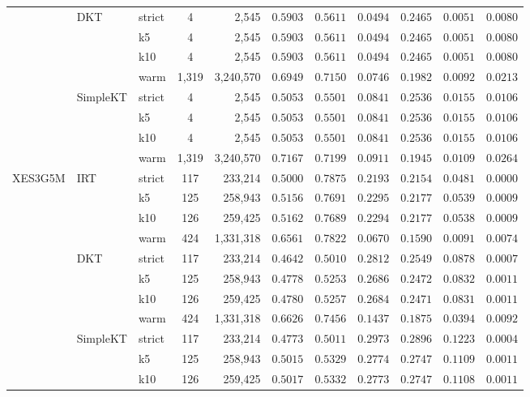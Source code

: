 \begin{table}[tbp]
{\begin{tabular}{lllcrcccccc}
 & DKT & strict & 4 & 2,545 & $0.5903$ & $0.5611$ & $0.0494$ & $0.2465$ & $0.0051$ & $0.0080$ \\
 &  & k5 & 4 & 2,545 & $0.5903$ & $0.5611$ & $0.0494$ & $0.2465$ & $0.0051$ & $0.0080$ \\
 &  & k10 & 4 & 2,545 & $0.5903$ & $0.5611$ & $0.0494$ & $0.2465$ & $0.0051$ & $0.0080$ \\
 &  & warm & 1,319 & 3,240,570 & $0.6949$ & $0.7150$ & $0.0746$ & $0.1982$ & $0.0092$ & $0.0213$ \\
 & SimpleKT & strict & 4 & 2,545 & $0.5053$ & $0.5501$ & $0.0841$ & $0.2536$ & $0.0155$ & $0.0106$ \\
 &  & k5 & 4 & 2,545 & $0.5053$ & $0.5501$ & $0.0841$ & $0.2536$ & $0.0155$ & $0.0106$ \\
 &  & k10 & 4 & 2,545 & $0.5053$ & $0.5501$ & $0.0841$ & $0.2536$ & $0.0155$ & $0.0106$ \\
 &  & warm & 1,319 & 3,240,570 & $0.7167$ & $0.7199$ & $0.0911$ & $0.1945$ & $0.0109$ & $0.0264$ \\
\midrule
XES3G5M & IRT & strict & 117 & 233,214 & $0.5000$ & $0.7875$ & $0.2193$ & $0.2154$ & $0.0481$ & $0.0000$ \\
 &  & k5 & 125 & 258,943 & $0.5156$ & $0.7691$ & $0.2295$ & $0.2177$ & $0.0539$ & $0.0009$ \\
 &  & k10 & 126 & 259,425 & $0.5162$ & $0.7689$ & $0.2294$ & $0.2177$ & $0.0538$ & $0.0009$ \\
 &  & warm & 424 & 1,331,318 & $0.6561$ & $0.7822$ & $0.0670$ & $0.1590$ & $0.0091$ & $0.0074$ \\
 & DKT & strict & 117 & 233,214 & $0.4642$ & $0.5010$ & $0.2812$ & $0.2549$ & $0.0878$ & $0.0007$ \\
 &  & k5 & 125 & 258,943 & $0.4778$ & $0.5253$ & $0.2686$ & $0.2472$ & $0.0832$ & $0.0011$ \\
 &  & k10 & 126 & 259,425 & $0.4780$ & $0.5257$ & $0.2684$ & $0.2471$ & $0.0831$ & $0.0011$ \\
 &  & warm & 424 & 1,331,318 & $0.6626$ & $0.7456$ & $0.1437$ & $0.1875$ & $0.0394$ & $0.0092$ \\
 & SimpleKT & strict & 117 & 233,214 & $0.4773$ & $0.5011$ & $0.2973$ & $0.2896$ & $0.1223$ & $0.0004$ \\
 &  & k5 & 125 & 258,943 & $0.5015$ & $0.5329$ & $0.2774$ & $0.2747$ & $0.1109$ & $0.0011$ \\
 &  & k10 & 126 & 259,425 & $0.5017$ & $0.5332$ & $0.2773$ & $0.2747$ & $0.1108$ & $0.0011$ \\

\end{tabular}}
\end{table}
